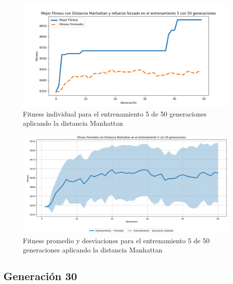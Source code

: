 \documentclass[conference]{IEEEtran}
\begin{document}
\begin{figure}
    \centering
    \includegraphics[width=0.9 \linewidth]{Manhattan/Fitness_individual_50Gen/Fitness_5_Manh_50Gen.png}
    \caption{Fitness individual para el entrenamiento 5 de 50 generaciones aplicando la distancia Manhattan}
    \label{fig:manhattan_5_50}
\end{figure}
\begin{figure}
    \centering
    \includegraphics[width=0.9 \linewidth]{Manhattan/Fitness_individual_50Gen/Fitness_5_Manh_50Gen_Sombra.png}
    \caption{Fitness promedio y desviaciones para el entrenamiento 5 de 50 generaciones aplicando la distancia Manhattan}
    \label{fig:manhattan_5_50_sombra}
\end{figure}

\subsection{Generación 30}
\setcounter{figure}{0}
\renewcommand{\thefigure}{S\arabic{figure}B-M}
\end{document}
